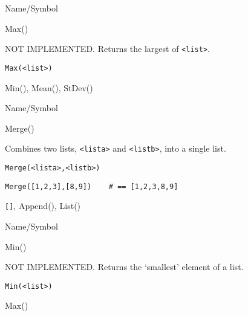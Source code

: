 \rl


\begin{desc}{Name/Symbol}
\item[Name/Symbol]	Max()            

\item[Description]	NOT IMPLEMENTED. Returns the largest of \verb+<list>+.

\item[Usage]		
\begin{verbatim}
Max(<list>)
\end{verbatim}

\item[Example]	

\item[See Also]	Min(), Mean(), StDev()
\end{desc}

\rl




\begin{desc}{Name/Symbol}
\item[Name/Symbol]	Merge()

\item[Description]	Combines two lists, \verb+<lista>+ and \verb+<listb>+, into a single list.

\item[Usage]		
\begin{verbatim}
Merge(<lista>,<listb>)
\end{verbatim}

\item[Example]	
\begin{verbatim}
Merge([1,2,3],[8,9]) 	# == [1,2,3,8,9]
\end{verbatim}

\item[See Also]	\verb+[]+, Append(), List()
\end{desc}

\rl


\begin{desc}{Name/Symbol}
\item[Name/Symbol]	Min() 

\item[Description]	NOT IMPLEMENTED.  Returns the `smallest' element of a list.

\item[Usage]	
\begin{verbatim}
Min(<list>)
\end{verbatim}

\item[Example]	

\item[See Also]	Max()
\end{desc}

